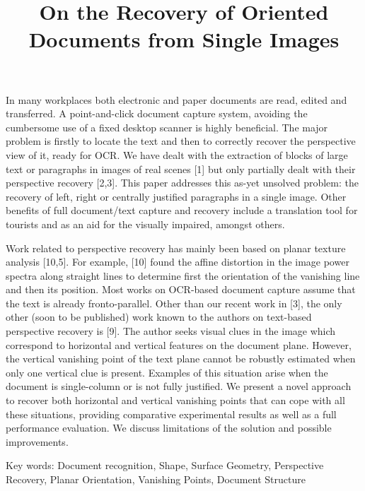 \documentclass[a4paper]{article}
\begin{document}
 \title{On the Recovery of Oriented Documents from Single Images}
\date{}
\author{}
\maketitle


In many workplaces both electronic and paper documents are read, edited and
transferred. A point-and-click document capture system, avoiding the cumbersome
use of a fixed desktop scanner is highly beneficial. The major problem is
firstly to locate the text and then to correctly recover the perspective view of
it, ready for OCR. We have dealt with the extraction of blocks of large text or
paragraphs in images of real scenes [1] but only partially dealt with their
perspective recovery [2,3].  This paper addresses this as-yet unsolved problem: the
recovery of left, right or centrally justified paragraphs in a single
image. Other benefits of full document/text capture and recovery include a
translation tool for tourists and as an aid for the visually impaired, amongst
others.

Work related to perspective recovery has mainly been based on planar texture
analysis [10,5]. For example, [10] found the affine distortion
in the image power spectra along straight lines to determine first the
orientation of the vanishing line and then its position. Most works on OCR-based
document capture assume that the text is already
fronto-parallel.  Other than our recent work in [3], the only other (soon to
be published) work known to the authors on text-based perspective recovery is [9].  The author seeks visual clues in the image which correspond to
horizontal and vertical features on the document plane.  However, the vertical
vanishing point of the text plane cannot be robustly estimated when only one
vertical clue is present.  Examples of this situation arise when the document is
single-column or is not fully justified.  We present a novel approach to recover
both horizontal and vertical vanishing points that can cope with all these
situations, providing comparative experimental results as well as a full
performance evaluation. We discuss limitations of the solution and possible
improvements.


Key words:
Document recognition, Shape, Surface Geometry, Perspective Recovery, Planar Orientation, Vanishing Points, Document Structure


% 
% 
\end{document}
